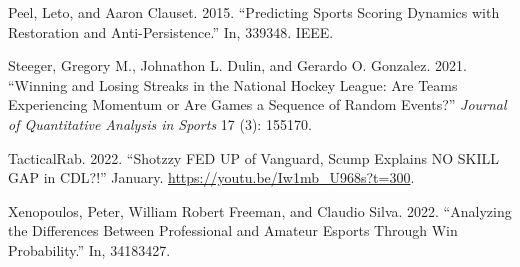 \documentclass{article}
\newlength{\cslhangindent}
\newlength{\cslentryspacingunit} %
\newenvironment{CSLReferences}[2] %
 {%
  \setlength{\parindent}{0pt}
  \ifodd #1
  \let\oldpar\par
  \def\par{\hangindent=\cslhangindent\oldpar}
  \fi
  \setlength{\parskip}{#2\cslentryspacingunit}
 }%
 {}
\begin{document}
\begin{CSLReferences}{1}{0}
\leavevmode{}%
Peel, Leto, and Aaron Clauset. 2015. {``Predicting Sports Scoring
Dynamics with Restoration and Anti-Persistence.''} In, 339348. IEEE.

\leavevmode{}%
Steeger, Gregory M., Johnathon L. Dulin, and Gerardo O. Gonzalez. 2021.
{``Winning and Losing Streaks in the National Hockey League: Are Teams
Experiencing Momentum or Are Games a Sequence of Random Events?''}
\emph{Journal of Quantitative Analysis in Sports} 17 (3): 155170.

\leavevmode{}%
TacticalRab. 2022. {``Shotzzy FED UP of Vanguard, Scump Explains NO
SKILL GAP in CDL?!''} January. \url{https://youtu.be/Iw1mb_U968s?t=300}.

\leavevmode{}%
Xenopoulos, Peter, William Robert Freeman, and Claudio Silva. 2022.
{``Analyzing the Differences Between Professional and Amateur Esports
Through Win Probability.''} In, 34183427.

\end{CSLReferences}



\end{document}

